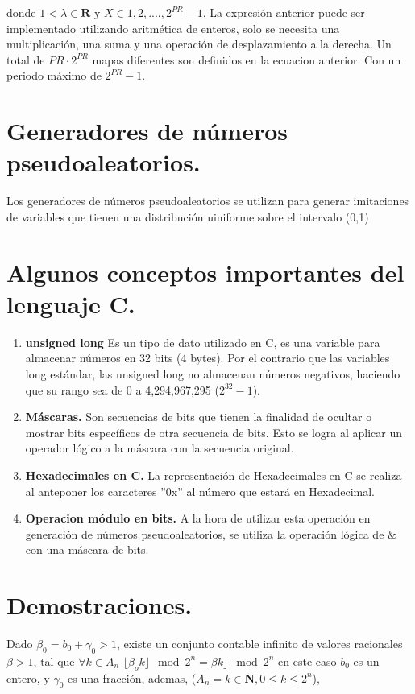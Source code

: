 \documentclass[12pt,3p]{elsarticle}
\begin{document}
donde $1<\lambda \in \mathbf{R}$  y $X \in {1, 2,...., 2^{PR}-1}$. La expresión anterior puede ser implementado utilizando aritmética de enteros, solo se necesita una multiplicación, una suma y una operación de desplazamiento a la derecha. Un total de $PR \cdot 2^{PR}$ mapas diferentes son definidos en la ecuacion anterior. Con un periodo máximo de $2^{PR}-1$. 

\section{Generadores de números pseudoaleatorios.}
Los generadores de números pseudoaleatorios se utilizan para generar  imitaciones de variables que tienen una distribución uiniforme sobre el intervalo (0,1)
\section{Algunos conceptos importantes del lenguaje C.}

\begin{enumerate}
\item \textbf{unsigned long} Es un tipo de dato utilizado en C, es una variable para almacenar números en 32 bits (4 bytes). Por el contrario que las variables long estándar, las unsigned long no almacenan números negativos, haciendo que su rango sea de 0 a 4,294,967,295 ($2^{32} - 1$).


\item \textbf{Máscaras.} Son secuencias de bits que tienen la finalidad de ocultar o mostrar bits específicos de otra secuencia de bits. Esto se logra al aplicar un operador lógico a la máscara con la secuencia original.

\item \textbf{Hexadecimales en C.} La representación de Hexadecimales en C se realiza al anteponer los caracteres ''0x'' al número que estará en Hexadecimal.

\item \textbf{Operacion módulo en bits.} A la hora de utilizar esta operación en generación de números pseudoaleatorios, se utiliza la operación lógica de $ \& $ con una máscara de bits. 

\end{enumerate}

\section{Demostraciones.}

Dado $\beta_{0}=b_{0}+\gamma_{0}>1$, existe un conjunto contable infinito de valores racionales $\beta>1$, tal que $\forall k \in A_{n}$  $\lfloor \beta_{o}k \rfloor  \mod{2^{n}} =  \beta k \rfloor  \mod{2^{n}} $
en este caso $b_{0}$ es un entero, y $\gamma_{0}$ es una fracción, ademas,  ($A_{n}= k \in \mathbf{N}, 0 \leq k \leq 2^{n}$),
 
\end{document}
